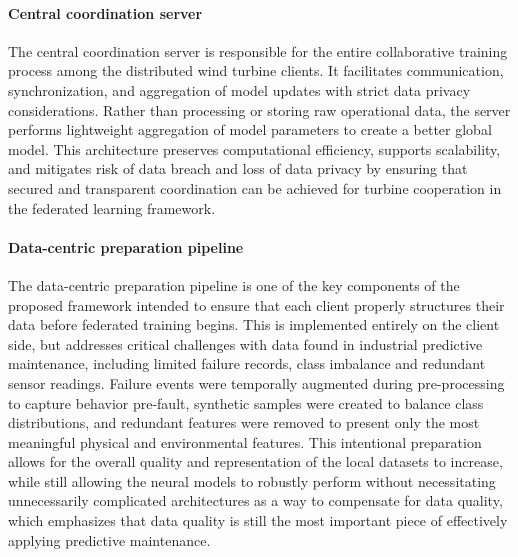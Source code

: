 \documentclass[12pt]{article}
\begin{document}


\paragraph{Central coordination server} The central coordination server is responsible for the entire collaborative training process among the distributed wind turbine clients. It facilitates communication, synchronization, and aggregation of model updates with strict data privacy considerations. Rather than processing or storing raw operational data, the server performs lightweight aggregation of model parameters to create a better global model. This architecture preserves computational efficiency, supports scalability, and mitigates risk of data breach and loss of data privacy by ensuring that secured and transparent coordination can be achieved for turbine cooperation in the federated learning framework.



\paragraph{Data-centric preparation pipeline}The data-centric preparation pipeline is one of the key components of the proposed framework intended to ensure that each client properly structures their data before federated training begins. This is implemented entirely on the client side, but addresses critical challenges with data found in industrial predictive maintenance, including limited failure records, class imbalance and redundant sensor readings. Failure events were temporally augmented during pre-processing to capture behavior pre-fault, synthetic samples were created to balance class distributions, and redundant features were removed to present only the most meaningful physical and environmental features. This intentional preparation allows for the overall quality and representation of the local datasets to increase, while still allowing the neural models to robustly perform without necessitating unnecessarily complicated architectures as a way to compensate for data quality, which emphasizes that data quality is still the most important piece of effectively applying predictive maintenance.\\
\end{document}
